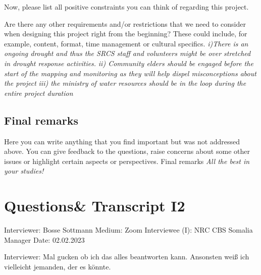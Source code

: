 Now, please list all positive constraints you can think of regarding this project.\newline

Are there any other requirements and/or restrictions that we need to consider when designing this project right from the beginning? These could include, for example, content, format, time management or cultural specifics.\newline
\textit{i)There is an ongoing drought and thus the SRCS staff and volunteers might be over stretched in drought response activities.}\newline
\textit{ii) Community elders should be engaged before the start of the mapping and monitoring as they will help dispel misconceptions about the project}\newline
\textit{iii) the ministry of water resources should be in the loop during the entire project duration}\newline

\subsection*{Final remarks}
Here you can write anything that you find important but was not addressed above. You can give feedback to the questions, raise concerns about some other issues or highlight certain aspects or perspectives.\newline
Final remarks \newline
\textit{All the best in your studies!}


\section{Questions\& Transcript I2}
Interviewer: Bosse Sottmann\newline
Medium: Zoom\newline
Interviewee (I): NRC CBS Somalia Manager \newline
Date: 02.02.2023\newline

Interviewer: Mal gucken ob ich das alles beantworten kann. Ansonsten weiß ich vielleicht jemanden, der es könnte.

